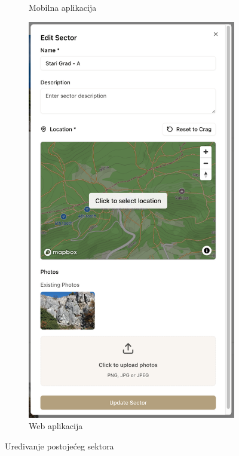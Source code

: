 \begin{figure}[H]
\begin{subfigure}[b]{0.38\textwidth}
        \caption{Mobilna aplikacija}
        \label{fig:uredjivanje_sektora_mob}
    \end{subfigure}
    \hfill
    \begin{subfigure}[b]{0.43\textwidth}
        \centering
        \includegraphics[width=\textwidth]{images/implementacija/web/editing-options/edit-sector.png}
        \caption{Web aplikacija}
        \label{fig:uredjivanje_sektora_web}
    \end{subfigure}
    \caption{Uređivanje postojećeg sektora}
    \label{fig:uredjivanje_sektora}
\end{figure}

